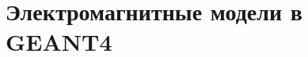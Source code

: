 ~\cite{bespalov2008, kolchuzkin1978, nemec1975}






  

\section{Электромагнитные модели в GEANT4 }\label{sec:theory/models}


